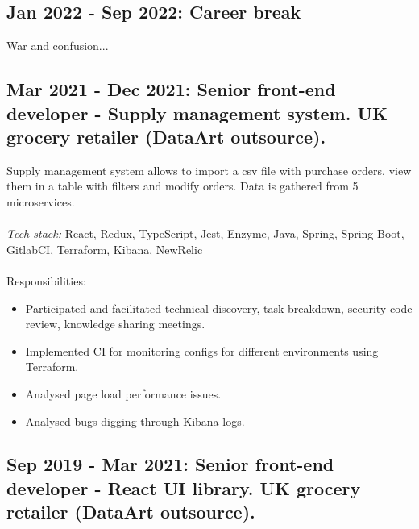 \documentclass[a4paper, 14pt]{article}
\begin{document}
  \subsection{Jan 2022 - Sep 2022: Career break}
    War and confusion...

  \subsection{Mar 2021 - Dec 2021: Senior front-end developer - Supply management system. UK grocery retailer (DataArt outsource).}
  Supply management system allows to import a csv file with purchase orders, view them in a table with filters and modify orders. Data is gathered from 5 microservices. \\
  \\
  \textit{Tech stack:} React, Redux, TypeScript, Jest, Enzyme, Java, Spring, Spring Boot, GitlabCI, Terraform, Kibana, NewRelic \\
  \\
  Responsibilities:
    \begin{itemize}
      \item Participated and facilitated technical discovery, task breakdown, security code review, knowledge sharing meetings. \\
      \item Implemented CI for monitoring configs for different environments using Terraform. \\
      \item Analysed page load performance issues. \\
      \item Analysed bugs digging through Kibana logs. \\
    \end{itemize}

  \subsection{Sep 2019 - Mar 2021: Senior front-end developer - React UI library. UK grocery retailer (DataArt outsource).}
\end{document}
